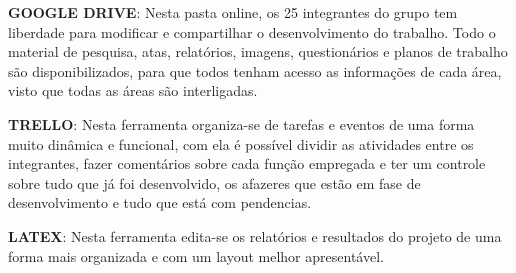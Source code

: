 \textbf{GOOGLE DRIVE}: 
Nesta pasta online, os 25 integrantes do grupo tem liberdade para modificar e compartilhar o desenvolvimento do trabalho. Todo o material de pesquisa, atas, relatórios, imagens, questionários e planos de trabalho são disponibilizados, para que todos tenham acesso as informações de cada área, visto que todas as áreas são interligadas.

\textbf{TRELLO}:
Nesta ferramenta organiza-se de tarefas e eventos de uma forma muito dinâmica e funcional, com ela é possível dividir as atividades entre os integrantes, fazer comentários sobre cada função empregada e ter um controle sobre tudo que já foi desenvolvido, os afazeres que estão em fase de desenvolvimento e tudo que está com pendencias.

\textbf{LATEX}:
Nesta ferramenta edita-se os relatórios e resultados do projeto de uma forma mais organizada e com um layout melhor apresentável.






%
%
%
%
%


